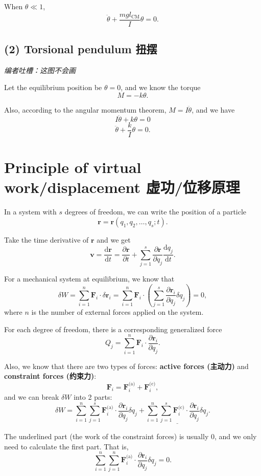 When \(\theta \ll 1\),
\[\ddot{\theta} + \frac{mgl_{\text{CM}}}{I} \theta = 0.\]

\subsection*{(2) Torsional pendulum
扭摆}\label{torsional-pendulum-ux626dux6446}

\emph{编者吐槽：这图不会画}

Let the equilibrium position be \(\theta = 0\), and we know the torque
\[M = - k \theta.\]

Also, according to the angular momentum theorem,
\(M = I \ddot{\theta}\), and we have \[I \ddot{\theta} + k \theta = 0\]
\[\ddot{\theta} + \frac{k}{I} \theta = 0.\]

\section{Principle of virtual work/displacement
虚功/位移原理}\label{principle-of-virtual-workdisplacement-ux865aux529fux4f4dux79fbux539fux7406}

In a system with \(s\) degrees of freedom, we can write the position of
a particle \[\boldsymbol{r} = \boldsymbol{r}(q_1, q_2, \dots, q_s; t).\]

Take the time derivative of \(\boldsymbol{r}\) and we get
\[\boldsymbol{v} = \frac{\mathrm{d} \boldsymbol{r}}{\mathrm{d}t} = \frac{\partial \boldsymbol{r}}{\partial t} + \sum_{j = 1}^{s} \frac{\partial \boldsymbol{r}}{\partial q_j} \frac{\mathrm{d} q_j}{\mathrm{d}t}.\]

For a mechanical system at equilibrium, we know that
\[\delta W = \sum_{i = 1}^{n} \boldsymbol{F}_i \cdot \delta \boldsymbol{r}_i = \sum_{i = 1}^{n} \boldsymbol{F}_i \cdot \left( \sum_{j = 1}^{s} \frac{\partial \boldsymbol{r}_i}{\partial q_j} \delta q_j \right) = 0,\]
where \(n\) is the number of external forces applied on the system.

For each degree of freedom, there is a corresponding generalized force
\[Q_j = \sum_{i = 1}^{n} \boldsymbol{F}_i \cdot \frac{\partial \boldsymbol{r}_i}{\partial q_j}.\]

Also, we know that there are two types of forces: \textbf{active forces
(主动力)} and \textbf{constraint forces (约束力)}:
\[\boldsymbol{F}_i = \boldsymbol{F}_i^{\text{(a)}} + \boldsymbol{F}_i^{\text{(c)}},\]
and we can break \(\delta W\) into 2 parts:
\[\delta W = \sum_{i = 1}^{n} \sum_{j = 1}^{s} \boldsymbol{F}_i^{\text{(a)}} \cdot \frac{\partial \boldsymbol{r}_i}{\partial q_j} \delta q_j + \underline{\sum_{i = 1}^{n} \sum_{j = 1}^{s} \boldsymbol{F}_i^{\text{(c)}} \cdot \frac{\partial \boldsymbol{r}_i}{\partial q_j} \delta q_j}.\]

The underlined part (the work of the constraint forces) is usually
\(0\), and we only need to calculate the first part. That is,
\[\sum_{i = 1}^{n} \sum_{j = 1}^{n} \boldsymbol{F}_i^{\text{(a)}} \cdot \frac{\partial \boldsymbol{r}_i}{\partial q_j} \delta q_j = 0.\]
